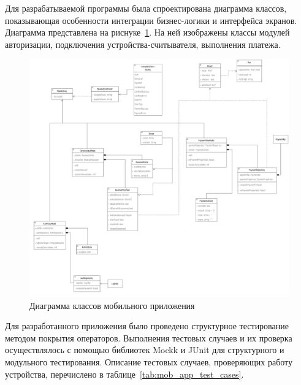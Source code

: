 Для разрабатываемой программы была спроектирована диаграмма классов, показывающая особенности интеграции бизнес-логики и интерфейса экранов.
Диаграмма представлена на риснуке~\ref{fig:classes}.
На ней изображены классы модулей авторизации, подключения устройства-считывателя, выполнения платежа.

\begin{figure}[H]
    \centering
    \includegraphics[angle=90, width=1\textwidth]{images/design/classes}
    \caption{\centering Диаграмма классов мобильного приложения}
    \label{fig:classes}
\end{figure}

Для разработанного приложения было проведено структурное тестирование методом покрытия операторов.
Выполнения тестовых случаев и их проверка осуществлялось с помощью библиотек Mockk и JUnit для структурного и модульного тестирования.
Описание тестовых случаев, проверяющих работу устройства, перечислено в таблице~\ref{tab:mob_app_test_cases}.

